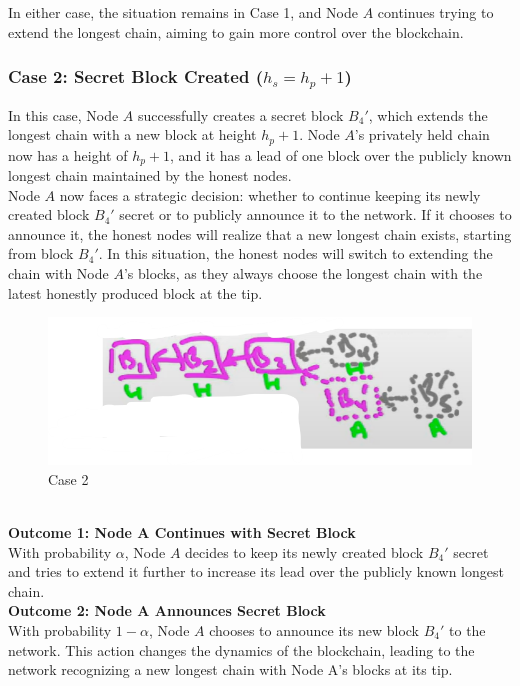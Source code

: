 In either case, the situation remains in Case 1, and Node $A$ continues trying to extend the longest chain, aiming to gain more control over the blockchain.

\subsubsection{Case 2: Secret Block Created ($h_s = h_p + 1$)}
In this case, Node $A$ successfully creates a secret block $B_{4}'$, which extends the longest chain with a new block at height $h_p +1$. Node $A$'s privately held chain now has a height of $h_p +1$, and it has a lead of one block over the publicly known longest chain maintained by the honest nodes.\\

Node $A$ now faces a strategic decision: whether to continue keeping its newly created block $B_{4}'$ secret or to publicly announce it to the network. If it chooses to announce it, the honest nodes will realize that a new longest chain exists, starting from block $B_{4}'$. In this situation, the honest nodes will switch to extending the chain with Node $A$'s blocks, as they always choose the longest chain with the latest honestly produced block at the tip.\\

\begin{figure}[h]
    \centering
    \includegraphics[scale = 0.5]{figures/f45.png}
    \caption{Case 2}
    \label{fig:mesh1}
\end{figure}\\
\noindent
\textbf{Outcome 1: Node A Continues with Secret Block}\\
With probability $\alpha$, Node $A$ decides to keep its newly created block $B_{4}'$ secret and tries to extend it further to increase its lead over the publicly known longest chain.\\
\noindent
\textbf{Outcome 2: Node A Announces Secret Block}\\
With probability $1-\alpha$, Node $A$ chooses to announce its new block $B_{4}'$ to the network. This action changes the dynamics of the blockchain, leading to the network recognizing a new longest chain with Node A's blocks at its tip.\\

